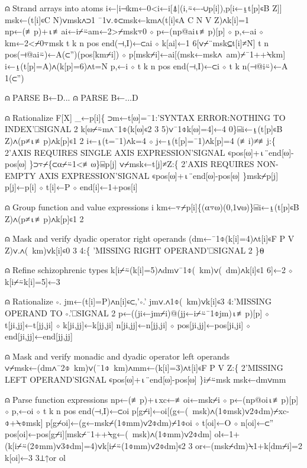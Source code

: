 \documentclass{article}%
\begin{document}
⍝ Strand arrays into atoms
         i←|i⊣km←0<i←i[⍋|(i,⍨←-∪p[i]),p[i←⍸t[p]∊B Z]]
         msk←(t[i]∊C N)∨msk∧⊃1 ¯1∨.⌽⊂msk←km∧(t[i]∊A C N V Z)∧k[i]=1
         np←(≢p)+⍳≢ai←i⌿⍨am←2>⌿msk⍪0 ⋄ p←(np@ai⍳≢p)[p] ⋄ p,←ai ⋄ km←2<⌿0⍪msk
         t k n pos end(⊣,I)←⊂ai ⋄ k[ai]←1 6[∨⌿¨msk⊆t[i]≠N]
         t n pos(⊣@ai⍨)←A(⊂'')(pos[km⌿i]) ⋄ p[msk⌿i]←ai[(msk←msk∧~am)⌿¯1++⍀km]
         i←⍸(t[p]=A)∧(k[p]=6)∧t=N
         p,←i ⋄ t k n pos end(⊣,I)←⊂i ⋄ t k n(⊣@i⍨)←A 1(⊂'')

⍝ PARSE B←D...
⍝ PARSE B←...D

⍝ Rationalize F[X]
         _←p[i]\{
                 ⊃m←t[⍵]=¯1:'SYNTAX ERROR:NOTHING TO INDEX'⎕SIGNAL 2
                 k[⍵⌿⍨m∧¯1⌽(k[⍵]∊2 3 5)∨¯1⌽k[⍵]=4]←4
         0\}⌸i←⍸(t[p]∊B Z)∧(p≠⍳≢p)∧k[p]∊1 2
         i←⍸(t=¯1)∧k=4 ⋄ j←⍸(t[p]=¯1)∧k[p]=4
         (≢i)≠≢j:\{
                 2'AXIS REQUIRES SINGLE AXIS EXPRESSION'SIGNAL ∊pos[⍵]+⍳¨end[⍵]-pos[⍵]
         \}⊃⍪⌿\{⊂⍺⌿⍨1<≢⍵\}⌸p[j]
         ∨⌿msk←t[j]≠Z:\{
                 2'AXIS REQUIRES NON-EMPTY AXIS EXPRESSION'SIGNAL ∊pos[⍵]+⍳¨end[⍵]-pos[⍵]
         \}msk⌿p[j]
         p[j]←p[i] ⋄ t[i]←P ⋄ end[i]←1+pos[i]

⍝ Group function and value expressions
         i km←⍪⌿p[i]\{(⍺⍪⍵)(0,1∨⍵)\}⌸i←⍸(t[p]∊B Z)∧(p≠⍳≢p)∧k[p]∊1 2

⍝ Mask and verify dyadic operator right operands
         (dm←¯1⌽(k[i]=4)∧t[i]∊F P V Z)∨.∧(~km)∨k[i]∊0 3 4:\{
                 'MISSING RIGHT OPERAND'⎕SIGNAL 2
         \}⍬

⍝ Refine schizophrenic types
         k[i⌿⍨(k[i]=5)∧dm∨¯1⌽(~km)∨(~dm)∧k[i]∊1 6]←2 ⋄ k[i⌿⍨k[i]=5]←3

⍝ Rationalize ∘.
         jm←(t[i]=P)∧n[i]∊⊂,'∘.'
         jm∨.∧1⌽(~km)∨k[i]∊3 4:'MISSING OPERAND TO ∘.'⎕SIGNAL 2
         p←((ji←jm⌿i)@(jj←i⌿⍨¯1⌽jm)⍳≢p)[p] ⋄ t[ji,jj]←t[jj,ji] ⋄ k[ji,jj]←k[jj,ji]
         n[ji,jj]←n[jj,ji] ⋄ pos[ji,jj]←pos[ji,ji] ⋄ end[ji,jj]←end[jj,jj]

⍝ Mask and verify monadic and dyadic operator left operands
         ∨⌿msk←(dm∧¯2⌽~km)∨(¯1⌽~km)∧mm←(k[i]=3)∧t[i]∊F P V Z:\{
                 2'MISSING LEFT OPERAND'SIGNAL ∊pos[⍵]+⍳¨end[⍵]-pos[⍵]
         \}i⌿⍨msk
         msk←dm∨mm

⍝ Parse function expressions
         np←(≢p)+⍳xc←≢oi←msk⌿i ⋄ p←(np@oi⍳≢p)[p] ⋄ p,←oi ⋄ t k n pos end(⊣,I)←⊂oi
         p[g⌿i]←oi[(g←(~msk)∧(1⌽msk)∨2⌽dm)⌿xc-⌽+⍀⌽msk]
         p[g⌿oi]←(g←msk⌿(1⌽mm)∨2⌽dm)⌿1⌽oi ⋄ t[oi]←O ⋄ n[oi]←⊂''
         pos[oi]←pos[g⌿i][msk⌿¯1++⍀g←(~msk)∧(1⌽mm)∨2⌽dm]
         ol←1+(k[i⌿⍨(2⌽mm)∨3⌽dm]=4)∨k[i⌿⍨(1⌽mm)∨2⌽dm]∊2 3
         or←(msk⌿dm)⍀1+k[dm⌿i]=2
         k[oi]←3 3⊥↑or ol
\end{document}
